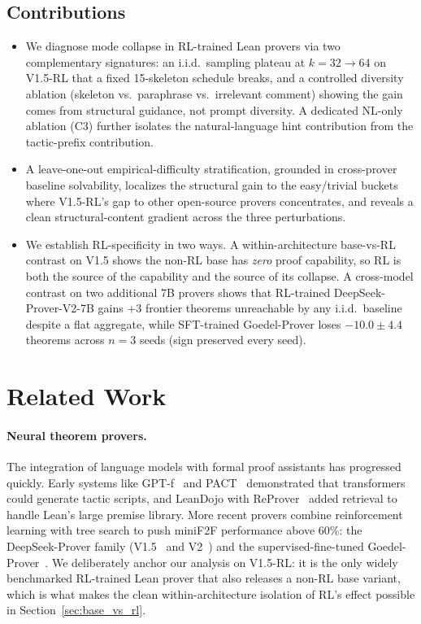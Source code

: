 \documentclass{article}
\begin{document}
\subsection{Contributions}
\begin{itemize}
    \item We diagnose mode collapse in RL-trained Lean provers via two complementary signatures: an i.i.d.\ sampling plateau at $k{=}32\to64$ on V1.5-RL that a fixed 15-skeleton schedule breaks, and a controlled diversity ablation (skeleton vs.\ paraphrase vs.\ irrelevant comment) showing the gain comes from structural guidance, not prompt diversity. A dedicated NL-only ablation (C3) further isolates the natural-language hint contribution from the tactic-prefix contribution.
    \item A leave-one-out empirical-difficulty stratification, grounded in cross-prover baseline solvability, localizes the structural gain to the easy/trivial buckets where V1.5-RL's gap to other open-source provers concentrates, and reveals a clean structural-content gradient across the three perturbations.
    \item We establish RL-specificity in two ways. A within-architecture base-vs-RL contrast on V1.5 shows the non-RL base has \emph{zero} proof capability, so RL is both the source of the capability and the source of its collapse. A cross-model contrast on two additional 7B provers shows that RL-trained DeepSeek-Prover-V2-7B gains $+3$ frontier theorems unreachable by any i.i.d.\ baseline despite a flat aggregate, while SFT-trained Goedel-Prover loses $-10.0 \pm 4.4$ theorems across $n{=}3$ seeds (sign preserved every seed).
\end{itemize}


\section{Related Work}
\label{sec:related}

\paragraph{Neural theorem provers.}
The integration of language models with formal proof assistants has progressed quickly. Early systems like GPT-f~\cite{polu2020generative} and PACT~\cite{han2022proof} demonstrated that transformers could generate tactic scripts, and LeanDojo with ReProver~\cite{yang2023leandojo} added retrieval to handle Lean's large premise library. More recent provers combine reinforcement learning with tree search to push miniF2F performance above 60\%: the DeepSeek-Prover family (V1.5~\cite{xin2024deepseek} and V2~\cite{deepseekv2prover}) and the supervised-fine-tuned Goedel-Prover~\cite{lin2025goedel}. We deliberately anchor our analysis on V1.5-RL: it is the only widely benchmarked RL-trained Lean prover that also releases a non-RL base variant, which is what makes the clean within-architecture isolation of RL's effect possible in Section~\ref{sec:base_vs_rl}.
\end{document}
